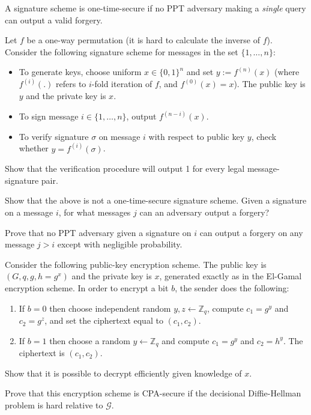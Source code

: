 \documentclass[a4paper,10pt,landscape,twocolumn]{scrartcl}
\begin{document}
\begin{exercise}
A signature scheme is one-time-secure if no PPT adversary making a \emph{single} query can output a valid forgery.

Let $f$ be a one-way permutation (it is hard to calculate the inverse of $f$). Consider the following signature
scheme for messages in the set $\{1,\dots , n\}$:
\begin{itemize}
\item To generate keys, choose uniform $x \in \{0, 1\}^n$ and set $y := f^{(n)} (x)$
(where $f^{(i)}(.)$ refers to $i$-fold iteration of $f$, and $f^{(0)} (x) = x$). The
public key is $y$ and the private key is $x$.
\item To sign message $i \in \{1,\dots , n\}$, output $f^{(n-i)} (x)$.
\item To verify signature $\sigma$ on message $i$ with respect to public key $y$,
check whether $y = f^{(i)} (\sigma)$.
\end{itemize}

\begin{subex}
Show that the verification procedure will output 1 for every legal message-signature pair.
\end{subex}
\begin{subex}
Show that the above is not a one-time-secure signature scheme.
Given a signature on a message $i$, for what messages $j$ can an
adversary output a forgery?
\end{subex}
\begin{subex}
Prove that no PPT adversary given a signature on $i$ can output a
forgery on any message $j > i$ except with negligible probability.
\end{subex}
\end{exercise}

\begin{exercise}
	Consider the following public-key encryption scheme. The public key is $(G,q,g,h=g^x)$ and the private key is $x$, generated exactly as in the El-Gamal encryption scheme. In order to encrypt a bit $b$, the sender does the following:
	\begin{enumerate}
		\item If $b=0$ then choose independent random $y,z \leftarrow \mathbb{Z}_q$, compute $c_1 = g^y$ and $c_2 = g^z$, and set the ciphertext equal to $(c_1, c_2)$.
		\item If $b = 1$ then choose a random $y\leftarrow \mathbb{Z}_q$ and compute $c_1 =g^y$ and $c_2 = h^y$. The ciphertext is $(c_1, c_2)$.
                \end{enumerate}
\begin{subex}                
	Show that it is possible to decrypt efficiently given
        knowledge of $x$.
      \end{subex}
\begin{subex}
      Prove that this encryption scheme is CPA-secure if the
      decisional Diffie-Hellman problem is hard relative to
      $\mathcal{G}$.
    \end{subex}
  \end{exercise}
\end{document}
